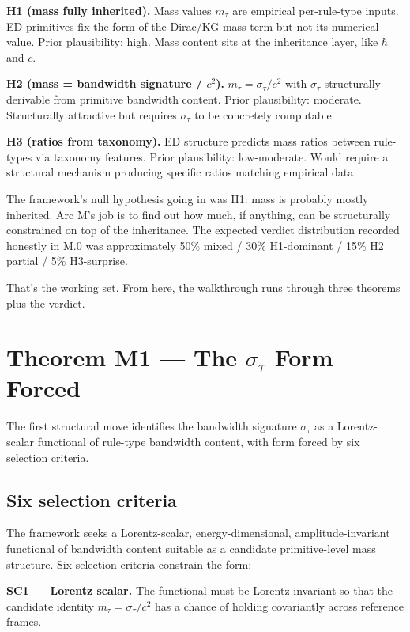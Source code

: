 \documentclass[11pt,a4paper]{article}
\begin{document}
\textbf{H1 (mass fully inherited).} Mass values $m_\tau$ are empirical per-rule-type inputs. ED primitives fix the form of the Dirac/KG mass term but not its numerical value. Prior plausibility: high. Mass content sits at the inheritance layer, like $\hbar$ and $c$.

\textbf{H2 (mass = bandwidth signature / $c^2$).} $m_\tau = \sigma_\tau/c^2$ with $\sigma_\tau$ structurally derivable from primitive bandwidth content. Prior plausibility: moderate. Structurally attractive but requires $\sigma_\tau$ to be concretely computable.

\textbf{H3 (ratios from taxonomy).} ED structure predicts mass ratios between rule-types via taxonomy features. Prior plausibility: low-moderate. Would require a structural mechanism producing specific ratios matching empirical data.

The framework's null hypothesis going in was H1: mass is probably mostly inherited. Arc M's job is to find out how much, if anything, can be structurally constrained on top of the inheritance. The expected verdict distribution recorded honestly in M.0 was approximately 50\% mixed / 30\% H1-dominant / 15\% H2 partial / 5\% H3-surprise.

That's the working set. From here, the walkthrough runs through three theorems plus the verdict.

\section{Theorem M1 --- The $\sigma_\tau$ Form Forced}

The first structural move identifies the bandwidth signature $\sigma_\tau$ as a Lorentz-scalar functional of rule-type bandwidth content, with form forced by six selection criteria.

\subsection{Six selection criteria}

The framework seeks a Lorentz-scalar, energy-dimensional, amplitude-invariant functional of bandwidth content suitable as a candidate primitive-level mass structure. Six selection criteria constrain the form:

\textbf{SC1 --- Lorentz scalar.} The functional must be Lorentz-invariant so that the candidate identity $m_\tau = \sigma_\tau/c^2$ has a chance of holding covariantly across reference frames.
\end{document}
